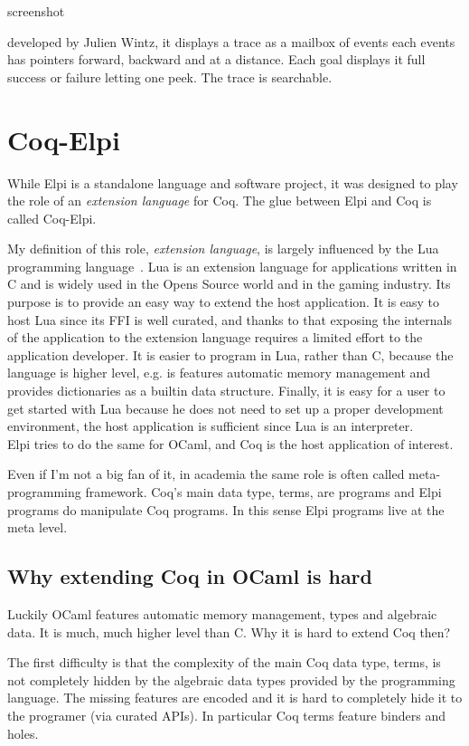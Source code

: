 \documentclass[a4paper, 11pt]{book}
\begin{document}
screenshot

developed by Julien Wintz, it displays a trace as a mailbox of events
each events has pointers forward, backward and at a distance.
Each goal displays it full success or failure letting one
peek. The trace is searchable.

\chapter{Coq-Elpi}

While Elpi is a standalone language and software project, it was designed to
play the role of an \emph{extension language} for Coq. The glue between Elpi and
Coq is called Coq-Elpi.

My definition of this role, \emph{extension language}, is largely influenced
by the Lua programming language~\cite{10.5555/1200583}. Lua is an extension
language for applications written in C and is widely used in the Opens Source
world and in the gaming industry.
Its purpose is to provide an easy way to extend the host application.
It is easy to host Lua since its FFI is well curated, and thanks to that
exposing the internals of the application to the extension language requires a
limited effort to the application developer. It is easier to program in Lua,
rather than C, because the language is higher level, e.g. is features automatic
memory management and provides dictionaries as a builtin data structure.
Finally, it is easy for a user to get started with Lua because he does not need
to set up a proper development environment, the host application is sufficient
since Lua is an interpreter.\\
Elpi tries to do the same for OCaml, and Coq is the host application of interest.

Even if I'm not a big fan of it, in academia the same role is often called
meta-programming framework. Coq's main data type, terms, are programs and Elpi
programs do manipulate Coq programs. In this sense Elpi programs live at the
meta level.

\section{Why extending Coq in OCaml is hard}

Luckily OCaml features automatic memory management, types and algebraic data.
It is much, much higher level than C. Why it is hard to extend Coq then?

The first difficulty is that the complexity of the main Coq data type, terms,
is not completely hidden by the algebraic data types provided by the programming
language. The missing features are encoded and it is hard to completely hide
it to the programer (via curated APIs). In particular Coq terms feature binders
and holes. 
\end{document}
